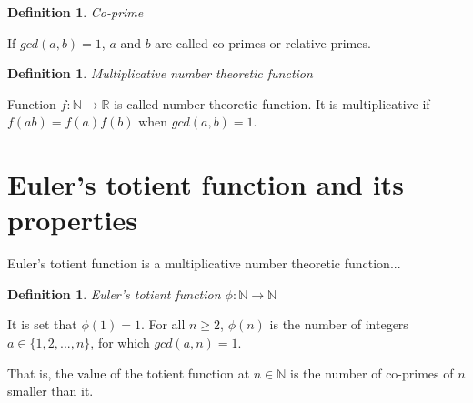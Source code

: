 \documentclass{article}
\theoremstyle{definition}
\newtheorem{definition}[subsubsection]{Definition}
\begin{document}
\begin{definition}{\emph{Co-prime}}

If $gcd(a,b) = 1$, $a$ and $b$ are called co-primes or relative primes.

\end{definition}

\begin{definition}{\emph{Multiplicative number theoretic function}}

Function $f: \mathbb{N} \rightarrow \mathbb{R}$ is called number theoretic function. It is multiplicative if $f(ab) = f(a)f(b)$ when $gcd(a, b)=1$.

\end{definition}

\section{Euler's totient function and its properties}

Euler's totient function is a multiplicative number theoretic function...

\begin{definition}{\emph{Euler's totient function $\phi: \mathbb{N} \rightarrow \mathbb{N}$}}

It is set that $\phi(1) = 1$. For all $n \geq 2$, $\phi(n)$ is the number of integers $a \in \{1,2,...,n\}$, for which $gcd(a,n) = 1$.


\end{definition}

That is, the value of the totient function at $n \in \mathbb{N}$ is the number of co-primes of $n$ smaller than it.
\end{document}
